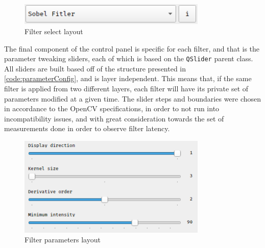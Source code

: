 \begin{figure}[H]
	\includegraphics[width=0.8\textwidth, height=0.09\textwidth]{resources/Buttons_Selector.png}
	\caption{Filter select layout}
\end{figure}

The final component of the control panel is specific for each filter, and that is the parameter tweaking
sliders, each of which is based on the \verb|QSlider| parent class. All sliders are built based off of the
structure presented in \cref{code:parameterConfig}, and is layer independent. This means that, if the same
filter is applied from two different layers, each filter will have its private set of parameters modified
at a given time. The slider steps and boundaries were chosen in accordance to the OpenCV specifications,
in order to not run into incompatibility issues, and with great consideration towards the set of measurements
done in order to observe filter latency.

\begin{figure}[H]
	\includegraphics[width=0.8\textwidth, height=0.5\textwidth]{resources/Buttons_Sliders.png}
	\caption{Filter parameters layout}
\end{figure}

